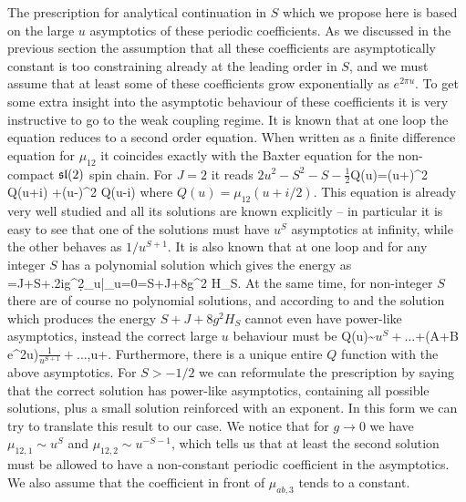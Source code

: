 The prescription for analytical continuation in $S$ which we propose here is based on the large $u$ asymptotics of these periodic coefficients.
As we discussed in the previous section the assumption that all these coefficients are asymptotically constant is too constraining already at the leading order in $S$, and we must assume that at least some of these coefficients grow exponentially as $e^{2\pi u}$.
To get some extra insight into the asymptotic behaviour of these coefficients it is very instructive to go to the weak coupling regime.
It is known that at one loop the equation  reduces to a second order equation. When written as a finite difference equation for $\mu_{12}$ it coincides exactly with the Baxter equation for the non-compact $\mathfrak{sl}(2)$ spin chain. 
For $J=2$ it reads
\beq\label{oneloopbaxter}
\(2u^2-S^2-S-\frac{1}{2}\)Q(u)=(u+)^2 Q(u+i)
+(u-)^2 Q(u-i)
\eeq
where $Q(u)=\mu_{12}(u+i/2)$.
This equation is already very well studied and all its solutions are known explicitly \cite{Derkachov:2002wz} -- in particular it is easy to see that one of the solutions must have $u^S$ asymptotics at infinity, while the other behaves as $1/u^{S+1}$.
It is also known that at one loop and for any integer $S$  has a polynomial solution which gives the energy as 
\beq
	\Delta=J+S+\left.2ig^2\d_u\log{}\right|_{u=0}=S+J+8g^2 H_S.
\eeq
At the same time, for non-integer $S$ there are of course no polynomial solutions, and according to \cite{Janik:2013nqa} and \cite{Alfimov:2014bwa} the solution which produces the energy $S+J+8g^2 H_S$ cannot even have power-like asymptotics, instead the correct large $u$ behaviour must be
\beq
Q(u)\sim \(u^S+\dots\)+(A+B e^{2\pi u})\(\frac{1}{u^{S+1}}+\dots\)\;\;,\;\;u\to +\infty\;.
\eeq
Furthermore, there is a unique entire $Q$ function with the above asymptotics.
For $S>-1/2$ we can reformulate the prescription by saying that the correct solution has power-like asymptotics, containing all possible solutions, plus a small solution reinforced with an exponent.
In this form we can try to translate this result to our case. 
We notice that for $g\to 0$ we have $\mu_{12,1}\sim u^{S}$ and $\mu_{12,2}\sim u^{-S-1}$, which tells us that at least the second solution must be allowed to have a non-constant periodic coefficient in the asymptotics. 
We also assume that the coefficient in front of $\mu_{ab,3}$ tends to a constant.

